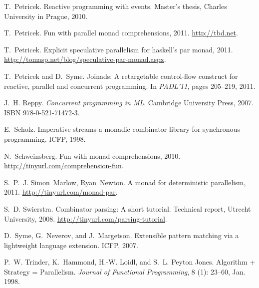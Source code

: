 \documentclass[preprint]{sigplanconf}
\begin{document}
\begin{thebibliography}{37}
T.~Petricek.
\newblock Reactive programming with events.
\newblock Master's thesis, Charles University in Prague, 2010.

T.~Petricek.
\newblock Fun with parallel monad comprehensions, 2011{}.
\newblock \url{http://tbd.net}.

T.~Petricek.
\newblock Explicit speculative parallelism for haskell's par monad,
  2011{}.
\newblock \url{http://tomasp.net/blog/speculative-par-monad.aspx}.

T.~Petricek and D.~Syme.
\newblock Joinads: A retargetable control-flow construct for reactive, parallel
  and concurrent programming.
\newblock In \emph{PADL'11}, pages 205--219, 2011.

J.~H. Reppy.
\newblock \emph{Concurrent programming in ML}.
\newblock Cambridge University Press, 2007.
\newblock ISBN 978-0-521-71472-3.

E.~Scholz.
\newblock Imperative streams-a monadic combinator library for synchronous
  programming.
\newblock ICFP, 1998.

N.~Schweinsberg.
\newblock Fun with monad comprehensions, 2010.
\newblock \url{http://tinyurl.com/comprehension-fun}.

S.~P.~J. Simon~Marlow, Ryan~Newton.
\newblock A monad for deterministic parallelism, 2011.
\newblock \url{http://tinyurl.com/monad-par}.

S.~D. Swierstra.
\newblock Combinator parsing: A short tutorial.
\newblock Technical report, Utrecht University, 2008.
\newblock \url{http://tinyurl.com/parsing-tutorial}.

D.~Syme, G.~Neverov, and J.~Margetson.
\newblock Extensible pattern matching via a lightweight language extension.
\newblock ICFP, 2007.

P.~W. Trinder, K.~Hammond, H.-W. Loidl, and S.~L. {Peyton Jones}.
\newblock Algorithm + {S}trategy = {P}arallelism.
\newblock \emph{Journal of Functional Programming}, 8 (1):
  23--60, Jan. 1998.


\end{thebibliography}
\end{document}
